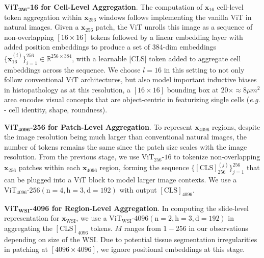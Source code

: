 {\textbf{ViT$_{\textbf{256}}$-16 for Cell-Level Aggregation}. The computation of $\mathbf{x}_{16}$ cell-level token aggregation within $\mathbf{x}_{256}$ windows follows implementing the vanilla ViT in natural images\cite{dosovitskiy2021image}. Given a $\mathbf{x}_{256}$ patch, the ViT unrolls this image as a sequence of non-overlapping $[16 \times 16]$ tokens followed by a linear embedding layer with added position embeddings to produce a set of 384-dim embeddings $\{\textbf{x}_{16}^{(i)}\}_{i=1}^{256} \in \mathbb{R}^{256 \times 384}$, with a learnable [CLS] token added to aggregate cell embeddings across the sequence. We choose $l = 16$ in this setting to not only follow conventional ViT architectures, but also model important inductive biases in histopathology as at this resolution, a  $[16 \times 16]$ bounding box at $20\times \approx 8 \mu m^2$ area encodes visual concepts that are object-centric in featurizing single cells (\textit{e.g.} - cell identity, shape, roundness).  

\textbf{ViT$_{\textbf{4096}}$-256 for Patch-Level Aggregation}. To represent $\mathbf{x}_{4096}$ regions, despite the image resolution being much larger than conventional natural images, the number of tokens remains the same since the patch size scales with the image resolution. From the previous stage, we use $\operatorname{ViT_{256}\textrm{-}16}$ to tokenize non-overlapping $\mathbf{x}_{256}$ patches within each $\mathbf{x}_{4096}$ region, forming the sequence $\{\operatorname{[CLS]}_{256}^{(j)}\}_{j=1}^{256}$ that can be plugged into a ViT block to model larger image contexts. We use a $\operatorname{ViT_{4096}\textrm{-}256(n=4, h=3, d=192)}$ with output $\operatorname{[CLS]}_{4096}$.

\textbf{ViT$_{\textbf{WSI}}$-4096 for Region-Level Aggregation}. In computing the slide-level representation for $\textbf{x}_{\text{WSI}}$, we use a $\operatorname{ViT_{\text{WSI}}\textrm{-}4096(n=2, h=3, d=192)}$ in aggregating the $\operatorname{[CLS]}_{4096}$ tokens. $M$ ranges from $1 - 256$ in our observations depending on size of the WSI. Due to potential tissue segmentation irregularities in patching at $[4096 \times 4096]$, we ignore positional embeddings at this stage. 

}
